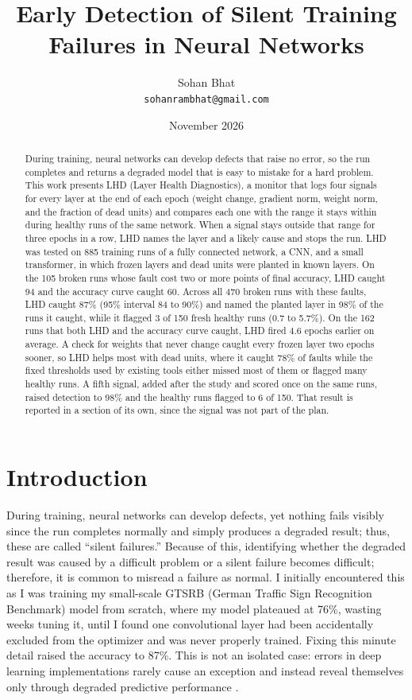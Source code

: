 \documentclass[11pt]{article}
\title{Early Detection of Silent Training Failures in Neural Networks}
\author{Sohan Bhat\\ \small \texttt{sohanrambhat@gmail.com}}
\date{November 2026}
\begin{document}
\maketitle

\begin{abstract}
During training, neural networks can develop defects that raise no error, so the run completes and returns a degraded model that is easy to mistake for a hard problem. This work presents LHD (Layer Health Diagnostics), a monitor that logs four signals for every layer at the end of each epoch (weight change, gradient norm, weight norm, and the fraction of dead units) and compares each one with the range it stays within during healthy runs of the same network. When a signal stays outside that range for three epochs in a row, LHD names the layer and a likely cause and stops the run. LHD was tested on 885 training runs of a fully connected network, a CNN, and a small transformer, in which frozen layers and dead units were planted in known layers. On the 105 broken runs whose fault cost two or more points of final accuracy, LHD caught 94 and the accuracy curve caught 60. Across all 470 broken runs with these faults, LHD caught 87\% (95\% interval 84 to 90\%) and named the planted layer in 98\% of the runs it caught, while it flagged 3 of 150 fresh healthy runs (0.7 to 5.7\%). On the 162 runs that both LHD and the accuracy curve caught, LHD fired 4.6 epochs earlier on average. A check for weights that never change caught every frozen layer two epochs sooner, so LHD helps most with dead units, where it caught 78\% of faults while the fixed thresholds used by existing tools either missed most of them or flagged many healthy runs. A fifth signal, added after the study and scored once on the same runs, raised detection to 98\% and the healthy runs flagged to 6 of 150. That result is reported in a section of its own, since the signal was not part of the plan.
\end{abstract}

\section{Introduction}

During training, neural networks can develop defects, yet nothing fails visibly since the run completes normally and simply produces a degraded result; thus, these are called ``silent failures.'' Because of this, identifying whether the degraded result was caused by a difficult problem or a silent failure becomes difficult; therefore, it is common to misread a failure as normal. I initially encountered this as I was training my small-scale GTSRB (German Traffic Sign Recognition Benchmark) model \citep{stallkamp2012} from scratch, where my model plateaued at 76\%, wasting weeks tuning it, until I found one convolutional layer had been accidentally excluded from the optimizer and was never properly trained. Fixing this minute detail raised the accuracy to 87\%. This is not an isolated case: errors in deep learning implementations rarely cause an exception and instead reveal themselves only through degraded predictive performance \citep{chwilczynski2024}.
\end{document}

